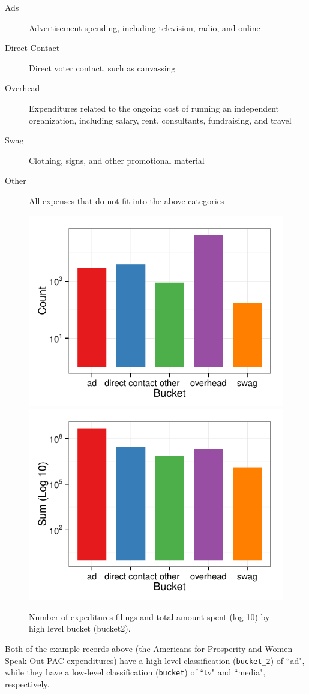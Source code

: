 \documentclass[11pt]{article}\usepackage{graphicx, color}
\newenvironment{knitrout}{}{} %
\begin{document}
\begin{description}
    \item[Ads] Advertisement spending, including television, radio, and online
    \item[Direct Contact] Direct voter contact, such as canvassing
    \item[Overhead] Expenditures related to the ongoing cost of running an independent organization, including salary, rent, consultants, fundraising, and travel
    \item[Swag] Clothing, signs, and other promotional material
    \item[Other] All expenses that do not fit into the above categories
\end{description}

\begin{knitrout}
\color{fgcolor}\begin{figure}[H]


{\centering \includegraphics[width=.45\textwidth]{figure/bucket_plot1} 
\includegraphics[width=.45\textwidth]{figure/bucket_plot2} 

}

\caption[Number of expeditures filings and total amount spent (log 10) by high level bucket (bucket2)]{Number of expeditures filings and total amount spent (log 10) by high level bucket (bucket2).\label{fig:bucket_plot}}
\end{figure}


\end{knitrout}


Both of the example records above (the Americans for Prosperity and Women Speak Out PAC expenditures) have a high-level classification (\texttt{bucket\_2}) of ``ad", while they have a low-level classification (\texttt{bucket}) of ``tv" and ``media", respectively.
\end{document}
